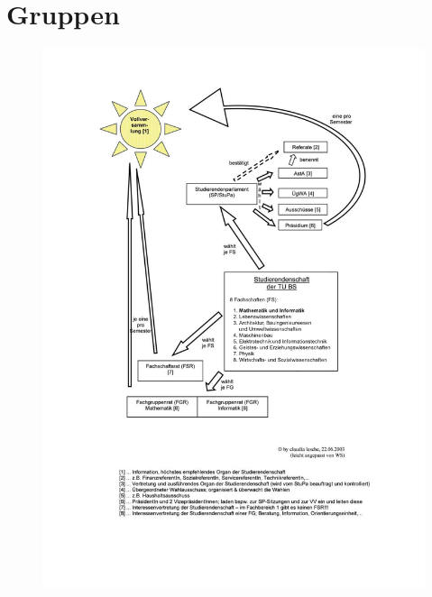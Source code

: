 \section{Gruppen}


\onecolumn
\begin{figure}[h]
  \centering\includegraphics[width=1\textwidth,height=1\textheight,trim=3cm 3cm 3cm 2cm]{bilder/gremienkunde.pdf}
\end{figure}
\twocolumn
